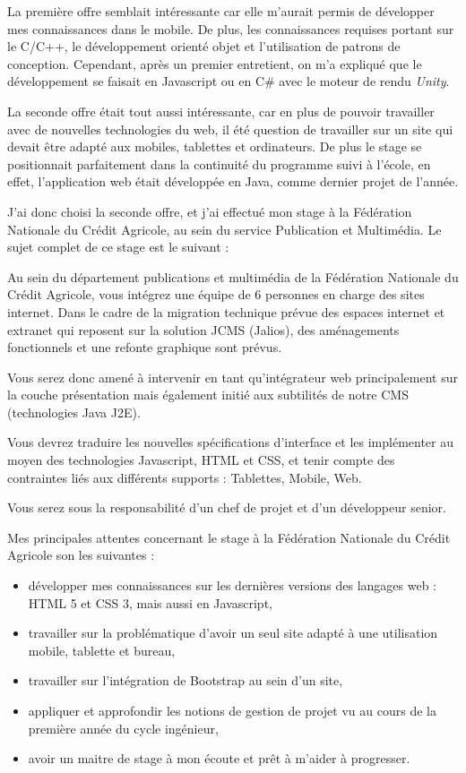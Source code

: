\documentclass[12pt,a4paper]{article}
\begin{document}
\medskip
La première offre semblait intéressante car elle m'aurait permis de développer mes connaissances dans le mobile. De plus, les connaissances requises portant sur le C/C++, le développement orienté objet et l'utilisation de patrons de conception. Cependant, après un premier entretient, on m'a expliqué que le développement se faisait en Javascript ou en C\# avec le moteur de rendu \textit{Unity}.\par 
\medskip
La seconde offre était tout aussi intéressante, car en plus de pouvoir travailler avec de nouvelles technologies du web, il été question de travailler sur un site qui devait être adapté aux mobiles, tablettes et ordinateurs. De plus le stage se positionnait parfaitement dans la continuité du programme suivi à l'école, en effet, l'application web était développée en Java, comme dernier projet de l'année.\par 
\medskip
J'ai donc choisi la seconde offre, et j'ai effectué mon stage à la Fédération Nationale du Crédit Agricole, au sein du service Publication et Multimédia. Le sujet complet de ce stage est le suivant :\par 
\medskip
Au sein du département publications et multimédia de la Fédération Nationale du Crédit Agricole, vous intégrez une équipe de 6 personnes en charge des sites internet. Dans le cadre de la migration technique prévue des espaces internet et extranet qui reposent sur la solution JCMS (Jalios), des aménagements fonctionnels et une refonte graphique sont prévus.\par
Vous serez donc amené à intervenir en tant qu'intégrateur web principalement sur la couche présentation mais également initié aux subtilités de notre CMS (technologies Java J2E).\par
Vous devrez traduire les nouvelles spécifications d'interface et les implémenter au moyen des technologies Javascript, \gls{HTML} et \gls{CSS}, et tenir compte des contraintes liés aux différents supports : Tablettes, Mobile, Web.\par 
Vous serez sous la responsabilité d'un chef de projet et d'un développeur senior.\par 
\medskip
Mes principales attentes concernant le stage à la Fédération Nationale du Crédit Agricole son les suivantes :
\begin{itemize}
\item développer mes connaissances sur les dernières versions des langages web : \gls{HTML} 5 et  \gls{CSS} 3, mais aussi en Javascript,
\item travailler sur la problématique d'avoir un seul site adapté à une utilisation mobile, tablette et bureau,
\item travailler sur l'intégration de Bootstrap au sein d'un site,
\item appliquer et approfondir les notions de gestion de projet vu au cours de la première année du cycle ingénieur,
\item avoir un maitre de stage à mon écoute et prêt à m'aider à progresser.
\end{itemize}
\end{document}
